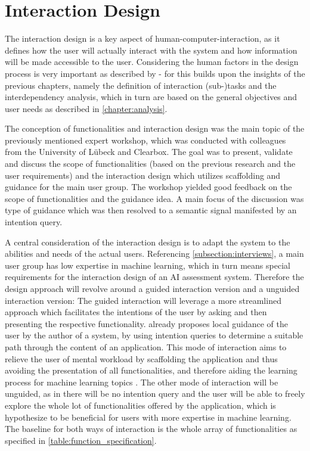 \documentclass[11pt,a4paper,english]{scrreprt}
\begin{document}
\section{Interaction Design}\label{section:interaction_design}
The interaction design is a key aspect of human-computer-interaction, as it defines how the user will actually interact with the system and how information will be made accessible to the user. Considering the human factors in the design process is very important as described by \textcite{wickens_2016_engineering} - for this builds upon the insights of the previous chapters, namely the definition of interaction (sub-)tasks and the interdependency analysis, which in turn are based on the general objectives and user needs as described in \autoref{chapter:analysis}.

The conception of functionalities and interaction design was the main topic of the previously mentioned expert workshop, which was conducted with colleagues from the University of Lübeck and Clearbox. The goal was to present, validate and discuss the scope of functionalities (based on the previous research and the user requirements) and the interaction design which utilizes scaffolding and guidance for the main user group. The workshop yielded good feedback on the scope of functionalities and the guidance idea. A main focus of the discussion was type of guidance which was then resolved to a semantic signal manifested by an intention query.

A central consideration of the interaction design is to adapt the system to the abilities and needs of the actual users. Referencing \autoref{subsection:interviews}, a main user group has low expertise in machine learning, which in turn means special requirements for the interaction design of an AI assessment system. Therefore the design approach will revolve around a guided interaction version and a unguided interaction version: The guided interaction will leverage a more streamlined approach which facilitates the intentions of the user by asking and then presenting the respective functionality. \textcite{trigg_guided_1988} already proposes local guidance of the user by the author of a system, by using intention queries to determine a suitable path through the content of an application. This mode of interaction aims to relieve the user of mental workload by scaffolding the application and thus avoiding the presentation of all functionalities, and therefore aiding the learning process for machine learning topics \parencite{soloway_learner_1994}. The other mode of interaction will be unguided, as in there will be no intention query and the user will be able to freely explore the whole lot of functionalities offered by the application, which is hypothesize to be beneficial for users with more expertise in machine learning. The baseline for both ways of interaction is the whole array of functionalities as specified in \autoref{table:function_specification}.
\end{document}
